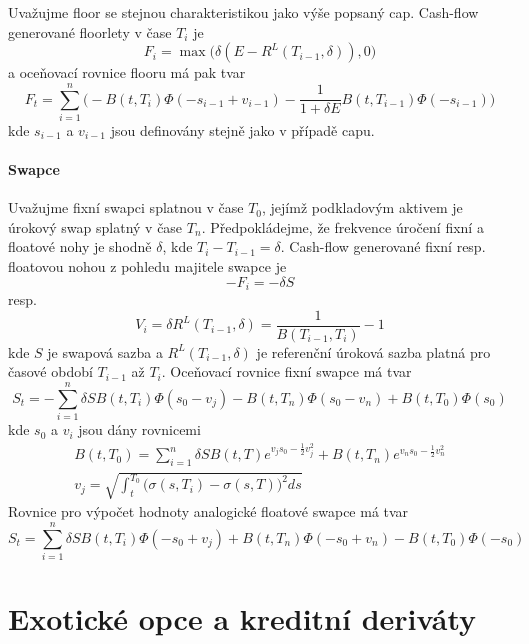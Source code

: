 \documentclass[a4paper]{book}
\begin{document}
Uvažujme floor se stejnou charakteristikou jako výše popsaný cap. Cash-flow generované floorlety v čase $T_i$ je
\begin{equation*}
F_i = \max \big( \delta(E - R^L(T_{i-1}, \delta)), 0 \big)
\end{equation*}
a oceňovací rovnice flooru má pak tvar
\begin{equation*}
F_t = \sum_{i=1}^n \Bigg( -B(t, T_i) \Phi(- s_{i-1} + v_{i-1}) - \frac{1}{1 + \delta E}B(t, T_{i-1})\Phi(-s_{i-1})\Bigg)
\end{equation*}
kde $s_{i-1}$ a $v_{i-1}$ jsou definovány stejně jako v případě capu.

\subsubsection{Swapce}

Uvažujme fixní swapci splatnou v čase $T_0$, jejímž podkladovým aktivem je úrokový swap splatný v čase $T_n$. Předpokládejme, že frekvence úročení fixní a floatové nohy je shodně $\delta$, kde $T_i - T_{i-1} = \delta$. Cash-flow generované fixní resp. floatovou nohou z pohledu majitele swapce je
\begin{equation*}
-F_i = - \delta S
\end{equation*}
resp.
\begin{equation*}
V_i = \delta R^L(T_{i-1}, \delta) = \frac{1}{B(T_{i-1}, T_i)} - 1
\end{equation*}
kde $S$ je swapová sazba a $R^L(T_{i-1}, \delta)$ je referenční úroková sazba platná pro časové období $T_{i-1}$ až $T_i$. Oceňovací rovnice fixní swapce má tvar
\begin{equation*}
S_t = - \sum_{i=1}^n \delta S B(t, T_i) \Phi(s_0 - v_j) - B(t, T_n) \Phi(s_0 - v_n) + B(t, T_0)\Phi(s_0)
\end{equation*}
kde $s_0$ a $v_i$ jsou dány rovnicemi
\begin{gather*}
B(t, T_0) = \sum_{i=1}^n \delta S B(t, T) e^{v_js_0 - \frac{1}{2}v_j^2} + B(t, T_n) e^{v_n s_0 - \frac{1}{2}v_n^2}\\
v_j = \sqrt{\int_t^{T_0}\big( \sigma(s, T_i) - \sigma(s, T)\big)^2 ds}
\end{gather*}
Rovnice pro výpočet hodnoty analogické floatové swapce má tvar
\begin{equation*}
S_t = \sum_{i=1}^n \delta S B(t, T_i) \Phi(-s_0 + v_j) + B(t, T_n) \Phi(-s_0 + v_n) - B(t, T_0)\Phi(-s_0)
\end{equation*}

\chapter{Exotické opce a kreditní deriváty}
\end{document}
